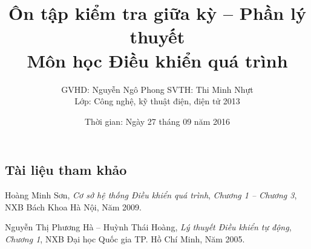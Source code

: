 \documentclass[12pt,a4paper]{article}
\title{ \textbf{Ôn tập kiểm tra giữa kỳ -- Phần lý thuyết} \vspace{.6cm} \\ \textbf{Môn học Điều khiển quá trình}}
\author{GVHD: Nguyễn Ngô Phong \hspace{1cm} SVTH: Thi Minh Nhựt\vspace{.4cm} \\ Lớp: Công nghệ, kỹ thuật điện, điện tử 2013}
\date{Thời gian: Ngày 27 tháng 09 năm 2016}
\begin{document}
\maketitle
\subsection*{Tài liệu tham khảo}
\begin{enumerate}[{[1].}]
	\item Hoàng Minh Sơn, \textit{Cơ sở hệ thống Điều khiển quá trình}, \textit{Chương 1 -- Chương 3}, NXB Bách Khoa Hà Nội, Năm 2009.
	
	\item Nguyễn Thị Phương Hà -- Huỳnh Thái Hoàng, \textit{Lý thuyết Điều khiển tự động}, \textit{Chương 1}, NXB Đại học Quốc gia TP. Hồ Chí Minh, Năm 2005.
\end{enumerate}
\end{document}
